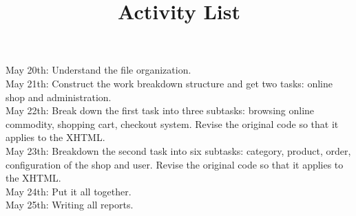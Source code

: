 \documentclass{report}
\begin{document}
\title{Activity List}
\maketitle

May 20th: Understand the file organization. \\

May 21th: Construct the work breakdown structure and get two tasks: online shop and administration. \\

May 22th: Break down the first task into three subtasks: browsing online commodity, shopping cart, checkout system. Revise the original code so that it applies to the XHTML. \\

May 23th: Breakdown the second task into six subtasks: category, product, order, configuration of the shop and user. Revise the original code so that it applies to the XHTML. \\

May 24th: Put it all together. \\

May 25th: Writing all reports. \\
\end{document}

